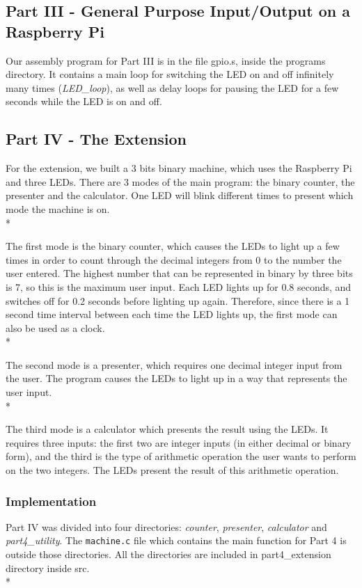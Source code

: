 \documentclass[letterpaper,11pt]{article}
\begin{document}
    \subsection{Part III - General Purpose Input/Output on a Raspberry Pi}
    Our assembly program for Part III is in the file gpio.s, inside the programs directory. It contains a main loop for switching the LED on and off infinitely many times (\textit{LED\_loop}), as well as delay loops for pausing the LED for a few seconds while the LED is on and off.
    \subsection{Part IV - The Extension}

    For the extension, we built a 3 bits binary machine, which uses the Raspberry Pi and three LEDs. There are 3 modes of the main program: the binary counter, the presenter and the calculator. One LED will blink different times to present which mode the machine is on.\\*

    \noindent The first mode is the binary counter, which causes the LEDs to light up a few times in order to count through the decimal integers from 0 to the number the user entered. The highest number that can be represented in binary by three bits is 7, so this is the maximum user input. Each LED lights up for 0.8 seconds, and switches off for 0.2 seconds before lighting up again. Therefore, since there is a 1 second time interval between each time the LED lights up, the first mode can also be used as a clock. \\*

    \noindent The second mode is a presenter, which requires one decimal integer input from the user. The program causes the LEDs to light up in a way that represents the user input. \\*

    \noindent The third mode is a calculator which presents the result using the LEDs. It requires three inputs: the first two are integer inputs (in either decimal or binary form), and the third is the type of arithmetic operation the user wants to perform on the two integers. The LEDs present the result of this arithmetic operation.

    \subsubsection{Implementation}
    Part IV was divided into four directories: \textit{counter}, \textit{presenter}, \textit{calculator} and \textit{part4\_utility}. The \texttt{machine.c} file which contains the main function for Part 4 is outside those directories. All the directories are included in part4\_extension directory inside src.\\*
\end{document}
